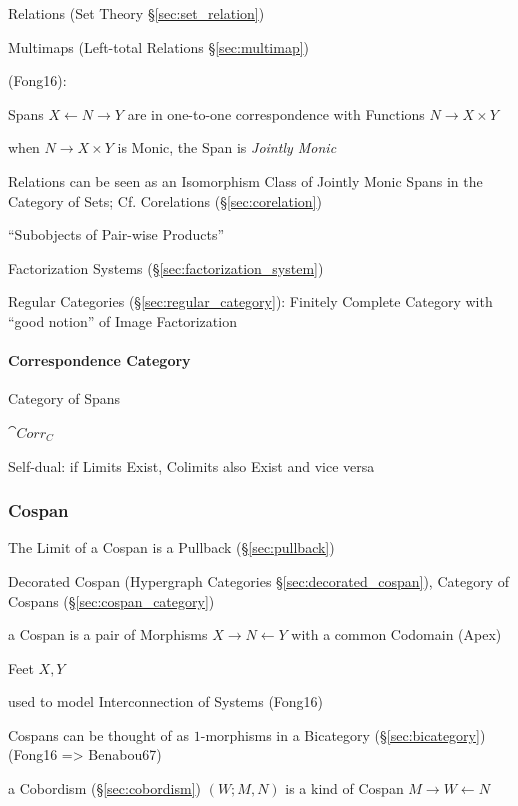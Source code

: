 \fist Relations (Set Theory \S\ref{sec:set_relation})

\fist Multimaps (Left-total Relations \S\ref{sec:multimap})

(Fong16):

Spans $X \leftarrow N \rightarrow Y$ are in one-to-one correspondence
with Functions $N \rightarrow X \times Y$

when $N \rightarrow X \times Y$ is Monic, the Span is \emph{Jointly
  Monic}

Relations can be seen as an Isomorphism Class of Jointly Monic Spans
in the Category of Sets; \fist Cf. Corelations
(\S\ref{sec:corelation})

``Subobjects of Pair-wise Products'' %

Factorization Systems (\S\ref{sec:factorization_system}) %

\fist Regular Categories (\S\ref{sec:regular_category}): Finitely
Complete Category with ``good notion'' of Image Factorization



\paragraph{Correspondence Category}\label{sec:correspondence_category}\hfill

Category of Spans

$\cat{Corr_C}$

Self-dual: if Limits Exist, Colimits also Exist and vice versa



\subsubsection{Cospan}\label{sec:cospan}

The Limit of a Cospan is a Pullback (\S\ref{sec:pullback})

\fist Decorated Cospan (Hypergraph Categories \S\ref{sec:decorated_cospan}),
Category of Cospans (\S\ref{sec:cospan_category})

a Cospan is a pair of Morphisms $X \rightarrow N \leftarrow Y$ with a common
Codomain (Apex)

Feet $X,Y$

used to model Interconnection of Systems (Fong16)

Cospans can be thought of as $1$-morphisms in a Bicategory
(\S\ref{sec:bicategory}) (Fong16 => Benabou67)

a Cobordism (\S\ref{sec:cobordism}) $(W; M, N)$ is a kind of Cospan
$M \rightarrow W \leftarrow N$

